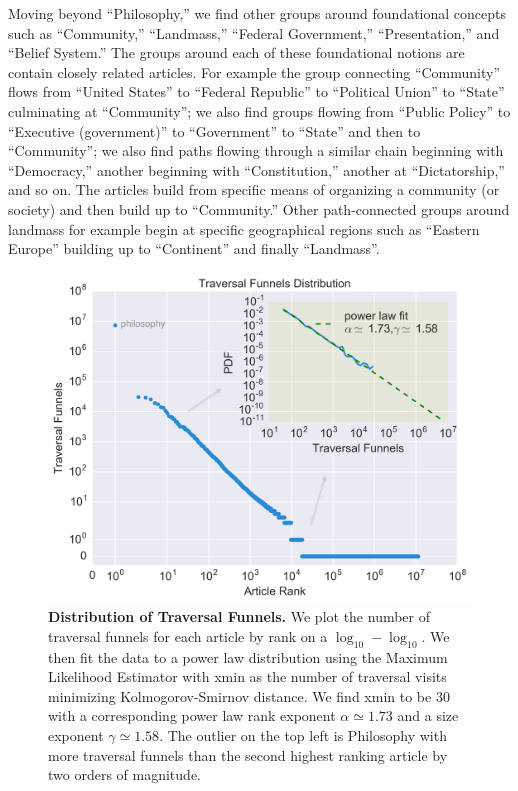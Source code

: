 \documentclass[pre,twocolumn,twoside,superscriptaddress,floatfix]{revtex4-1}
\begin{document}
{Moving beyond ``Philosophy,'' we find other groups around 
foundational concepts such as ``Community,'' ``Landmass,'' ``Federal Government,'' 
``Presentation,'' and ``Belief System.'' 
The groups around each of these foundational notions are 
contain closely related articles. For example the group connecting
``Community''
flows from ``United States'' to ``Federal Republic'' to ``Political Union'' to ``State'' culminating at ``Community''; we also find groups flowing from 
``Public Policy'' to ``Executive (government)'' to ``Government'' to ``State'' and then 
to ``Community''; we also find paths flowing through a similar chain beginning
with ``Democracy,'' another beginning with ``Constitution,'' another at 
``Dictatorship,'' and so on. The articles build from specific means of organizing
a community (or society) and then build up to ``Community.'' 
Other path-connected groups around landmass for example begin at specific geographical regions
such as ``Eastern Europe'' building up to ``Continent'' and finally ``Landmass''.

\begin{figure}[tp!]
  \includegraphics[width=\columnwidth]{funnels_distribution.pdf}
  \caption{
    \textbf{Distribution of Traversal Funnels.}
    We plot the number of traversal funnels for each article by rank on a $\log_{10}-\log_{10}$. We then fit the data to a power law 
    distribution using the Maximum Likelihood Estimator with xmin as the number of traversal visits minimizing Kolmogorov-Smirnov distance. We find xmin to be 30 with a corresponding power law rank exponent $\alpha \simeq 1.73$ and a size exponent $\gamma \simeq 1.58$.
    The outlier on the top left is Philosophy with more traversal funnels than the second highest ranking article by two orders of magnitude.
}
  \label{fig:Funnels Distribution}
\end{figure}

}
\end{document}
